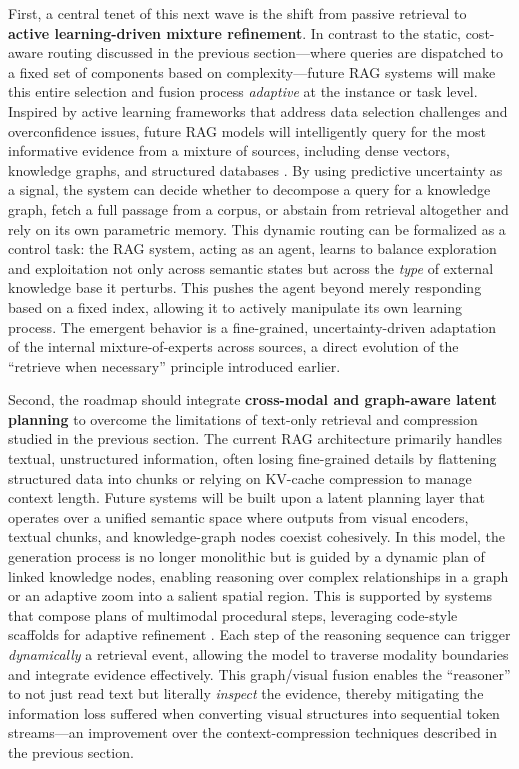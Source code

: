 \documentclass[11pt]{article}
\begin{document}
First, a central tenet of this next wave is the shift from passive retrieval to \textbf{active learning-driven mixture refinement}. In contrast to the static, cost-aware routing discussed in the previous section---where queries are dispatched to a fixed set of components based on complexity---future RAG systems will make this entire selection and fusion process \emph{adaptive} at the instance or task level. Inspired by active learning frameworks that address data selection challenges and overconfidence issues, future RAG models will intelligently query for the most informative evidence from a mixture of sources, including dense vectors, knowledge graphs, and structured databases \cite{ref465,ref466}. By using predictive uncertainty as a signal, the system can decide whether to decompose a query for a knowledge graph, fetch a full passage from a corpus, or abstain from retrieval altogether and rely on its own parametric memory. This dynamic routing can be formalized as a control task: the RAG system, acting as an agent, learns to balance exploration and exploitation not only across semantic states but across the \emph{type} of external knowledge base it perturbs. This pushes the agent beyond merely responding based on a fixed index, allowing it to actively manipulate its own learning process. The emergent behavior is a fine-grained, uncertainty-driven adaptation of the internal mixture-of-experts across sources, a direct evolution of the ``retrieve when necessary'' principle introduced earlier.

Second, the roadmap should integrate \textbf{cross-modal and graph-aware latent planning} to overcome the limitations of text-only retrieval and compression studied in the previous section. The current RAG architecture primarily handles textual, unstructured information, often losing fine-grained details by flattening structured data into chunks or relying on KV-cache compression to manage context length. Future systems will be built upon a latent planning layer that operates over a unified semantic space where outputs from visual encoders, textual chunks, and knowledge-graph nodes coexist cohesively. In this model, the generation process is no longer monolithic but is guided by a dynamic plan of linked knowledge nodes, enabling reasoning over complex relationships in a graph or an adaptive zoom into a salient spatial region. This is supported by systems that compose plans of multimodal procedural steps, leveraging code-style scaffolds for adaptive refinement \cite{ref467,ref468}. Each step of the reasoning sequence can trigger \emph{dynamically} a retrieval event, allowing the model to traverse modality boundaries and integrate evidence effectively. This graph/visual fusion enables the ``reasoner'' to not just read text but literally \emph{inspect} the evidence, thereby mitigating the information loss suffered when converting visual structures into sequential token streams---an improvement over the context-compression techniques described in the previous section.
\end{document}
